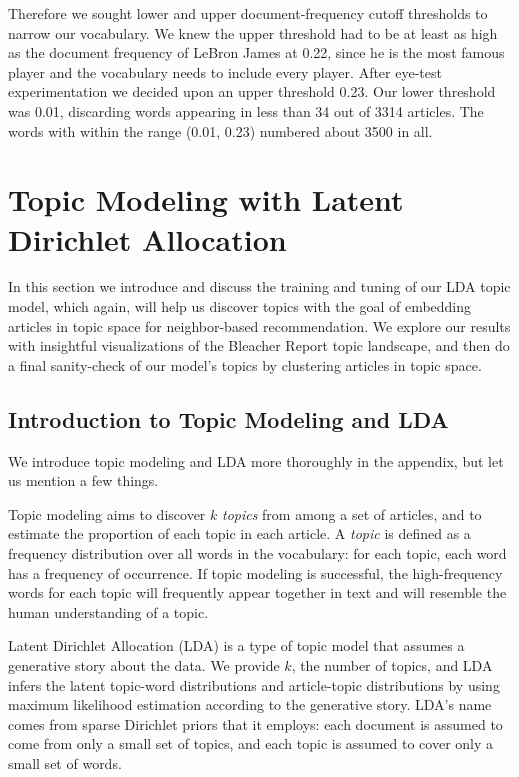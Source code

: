 \documentclass[11pt]{article}
\begin{document}
Therefore we sought lower and upper document-frequency cutoff thresholds to narrow our vocabulary.  We knew the upper threshold had to be at least as high as the document frequency of LeBron James at 0.22, since he is the most famous player and the vocabulary needs to include every player. After eye-test experimentation we decided upon an upper threshold 0.23. Our lower threshold was 0.01, discarding words appearing in less than 34 out of 3314 articles.  The words with within the range (0.01, 0.23) numbered about 3500 in all.

\section{Topic Modeling with Latent Dirichlet Allocation}
In this section we introduce and discuss the training and tuning of our LDA topic model, which again, will help us discover topics with the goal of embedding articles in topic space for neighbor-based recommendation. We explore our results with insightful visualizations of the Bleacher Report topic landscape, and then do a final sanity-check of our model's topics by clustering articles in topic space.

\subsection{Introduction to Topic Modeling and LDA}
We introduce topic modeling and LDA more thoroughly in the appendix, but let us mention a few things.

Topic modeling aims to discover $k$ \textit{topics} from among a set of articles, and to estimate the proportion of each topic in each article.  A \textit{topic} is defined as a frequency distribution over all words in the vocabulary: for each topic, each word has a frequency of occurrence.  If topic modeling is successful, the high-frequency words for each topic will frequently appear together in text and will resemble the human understanding of a topic. 

Latent Dirichlet Allocation (LDA) is a type of topic model that assumes a generative story about the data.  We provide $k$, the number of topics, and LDA infers the latent topic-word distributions and article-topic distributions by using maximum likelihood estimation according to the generative story.  LDA's name comes from sparse Dirichlet priors that it employs: each document is assumed to come from only a small set of topics, and each topic is assumed to cover only a small set of words.
\end{document}
